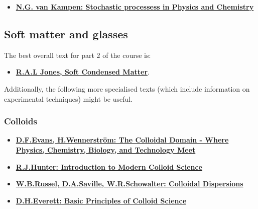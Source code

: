 \documentclass[
  letterpaper,
  DIV=11,
  numbers=noendperiod]{scrreprt}
\providecommand{\tightlist}{%
  \setlength{\itemsep}{0pt}\setlength{\parskip}{0pt}}
\begin{document}
\begin{itemize}
\tightlist
\item
  \textbf{\href{https://bris.on.worldcat.org/search/detail/162131511?queryString=Stochastic\%20Processes\%20in\%20Physics\%20and\%20Chemistry\%20by\%20N.G.\%20van\%20Kampen&clusterResults=true&stickyFacetsChecked=true&groupVariantRecords=false}{N.G.
  van Kampen: Stochastic processess in Physics and Chemistry}}
\end{itemize}

\subsection*{Soft matter and glasses}\label{soft-matter-and-glasses}

The best overall text for part 2 of the course is:

\begin{itemize}
\tightlist
\item
  \textbf{\href{https://bris.on.worldcat.org/search/detail/48753186?queryString=soft\%20condensed\%20matter&clusterResults=true&stickyFacetsChecked=true&groupVariantRecords=false}{R.A.L
  Jones, Soft Condensed Matter}}.
\end{itemize}

Additionally, the following more specialised texts (which include
information on experimental techniques) might be useful.

\subsubsection*{Colloids}\label{colloids}

\begin{itemize}
\tightlist
\item
  \textbf{\href{https://bris.on.worldcat.org/search/detail/39129921?queryString=The\%20Colloidal\%20Domain&clusterResults=true&stickyFacetsChecked=true&groupVariantRecords=false&newsArticles=off&bookReviews=off}{D.F.Evans,
  H.Wennerström: The Colloidal Domain - Where Physics, Chemistry,
  Biology, and Technology Meet}}
\item
  \textbf{\href{https://bris.on.worldcat.org/search/detail/27810428?queryString=Introduction\%20to\%20Modern\%20Colloid\%20Science&clusterResults=true&stickyFacetsChecked=true&groupVariantRecords=false&newsArticles=off&bookReviews=off}{R.J.Hunter:
  Introduction to Modern Colloid Science}}
\item
  \textbf{\href{https://bris.on.worldcat.org/search/detail/18869758?queryString=colloidal\%20dispersions&clusterResults=true&stickyFacetsChecked=true&groupVariantRecords=false&newsArticles=off&bookReviews=off}{W.B.Russel,
  D.A.Saville, W.R.Schowalter: Colloidal Dispersions}}
\item
  \textbf{\href{https://bris.on.worldcat.org/search/detail/232632488?queryString=Basic\%20Principles\%20of\%20Colloid\%20Science&clusterResults=true&stickyFacetsChecked=true&groupVariantRecords=false&newsArticles=off&bookReviews=off}{D.H.Everett:
  Basic Principles of Colloid Science}}
\end{itemize}
\end{document}
